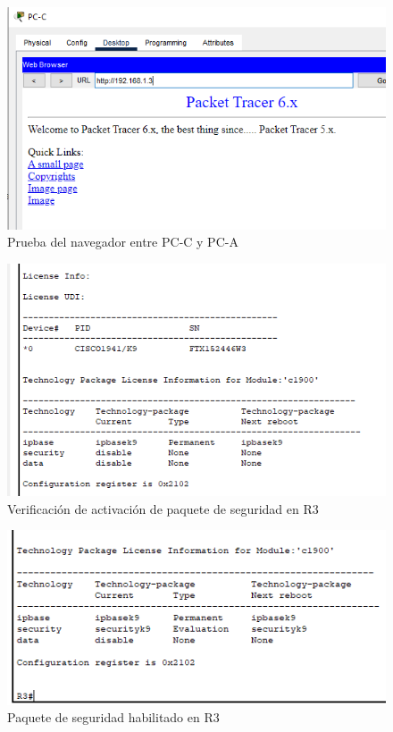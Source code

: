 \documentclass[11pt]{article}
\begin{document}
        \clearpage
        \begin{figure}[!h]
            \centering
            \includegraphics[scale=0.7]{img/part1-step3.png}
            \caption{Prueba del navegador entre PC-C y PC-A}
            \label{fig:part1-step3}
        \end{figure}
        
        \begin{figure}[!h]
            \centering
            \includegraphics[scale=0.7]{img/part2-step1.png}
            \caption{Verificación de activación de paquete de seguridad en R3}
            \label{fig:part2-step1}
        \end{figure}

        \clearpage
        \begin{figure}[!h]
            \centering
            \includegraphics[scale=0.8]{img/part2-step1b.png}
            \caption{Paquete de seguridad habilitado en R3}
            \label{fig:part2-step1b}
        \end{figure}
\end{document}
